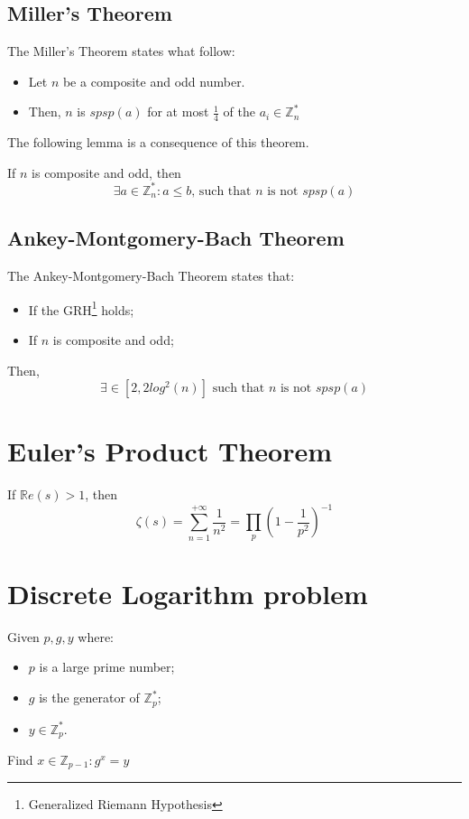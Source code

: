 \subsection{Miller's Theorem}
\begin{theorem}
    The Miller's Theorem states what follow:
    \begin{itemize}
        \item Let $n$ be a composite and odd number.
        \item Then, $n$ is $spsp(a)$ for at most $\frac{1}{4}$ of the $a_{i} \in \mathbb{Z}_{n}^{*}$
    \end{itemize}
\end{theorem}
The following lemma is a consequence of this theorem.
\begin{lemma}
    If $n$ is composite and odd, then \[\exists a \in \mathbb{Z}_{n}^{*}: a \leq b \text{, such that $n$ is not $spsp(a)$} \]
\end{lemma}

\subsection{Ankey-Montgomery-Bach Theorem}
\begin{theorem}
    The Ankey-Montgomery-Bach Theorem states that:
    \begin{itemize}
        \item If the GRH\footnote{Generalized Riemann Hypothesis} holds;
        \item If $n$ is composite and odd;
    \end{itemize}
    Then, \[\exists \in [2, 2 log^{2}(n)] \text{ such that $n$ is not $spsp(a)$}\]
\end{theorem}

\section{Euler's Product Theorem}
\begin{theorem}
    If $ \mathbb{R}e(s) > 1$, then \[\zeta(s) = \sum_{n = 1}^{+ \infty} \frac{1}{n^{2}} = \prod\limits_{p}(1 - \frac{1}{p^{2}})^{-1}\]
\end{theorem}

\section{Discrete Logarithm problem}
\begin{definition}\label{discrete_logarithm_prob}
    Given $p, g, y$ where:
    \begin{itemize}
        \item $p$ is a large prime number;
        \item $g$ is the generator of $\mathbb{Z}_{p}^{*}$;
        \item $y \in \mathbb{Z}_{p}^{*}$.
    \end{itemize}
    Find $x \in \mathbb{Z}_{p-1}: g^{x} = y$
\end{definition}

